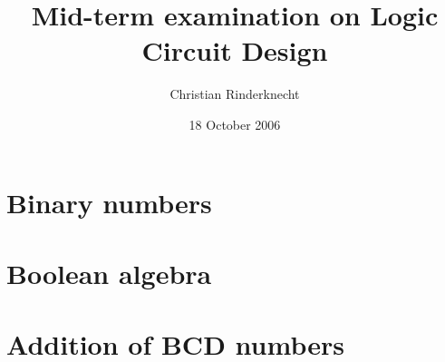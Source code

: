 \documentclass[11pt,a4paper]{article}
\title{Mid-term examination on Logic Circuit Design}
\author{Christian Rinderknecht}
\date{18 October 2006}
\begin{document}
\maketitle
\thispagestyle{empty}

\section{Binary numbers}



\section{Boolean algebra}




\section{Addition of BCD numbers}


\end{document}
